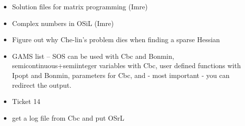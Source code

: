 \begin{itemize}
\item Solution files for matrix programming (Imre)

\item Complex numbers in OSiL (Imre)

\item Figure out why Che-lin's problem dies when finding a sparse Hessian

\item GAMS list -- SOS can be used with Cbc and Bonmin, semicontinuous+semiinteger
variables with Cbc, user defined functions with Ipopt and Bonmin,
parameters for Cbc, and - most important - you can redirect the output.

\item Ticket 14

\item get a log file from Cbc and put OSrL

\end{itemize}
